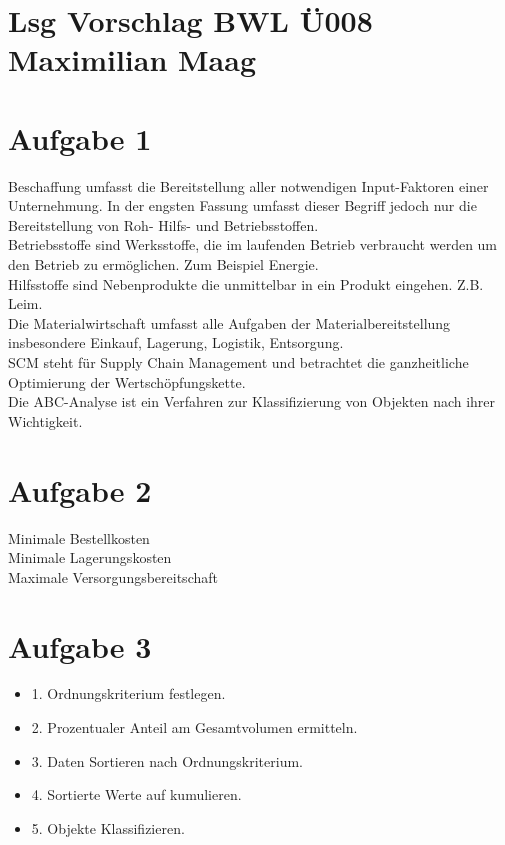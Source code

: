 \documentclass{article}
\begin{document}
	\section*{Lsg Vorschlag BWL Ü008 Maximilian Maag}
	\section*{Aufgabe 1}
	Beschaffung umfasst die Bereitstellung aller notwendigen Input-Faktoren einer Unternehmung. In der engsten Fassung umfasst dieser Begriff jedoch nur die Bereitstellung von Roh- Hilfs- und Betriebsstoffen. \\
	Betriebsstoffe sind Werksstoffe, die im laufenden Betrieb verbraucht werden um den Betrieb zu ermöglichen. Zum Beispiel Energie. \\
	Hilfsstoffe sind Nebenprodukte die unmittelbar in ein Produkt eingehen. Z.B. Leim. \\
	Die Materialwirtschaft umfasst alle Aufgaben der Materialbereitstellung insbesondere Einkauf, Lagerung, Logistik, Entsorgung. \\
	SCM steht für Supply Chain Management und betrachtet die ganzheitliche Optimierung der Wertschöpfungskette. \\
	Die ABC-Analyse ist ein Verfahren zur Klassifizierung von Objekten nach ihrer Wichtigkeit.
	\section*{Aufgabe 2}
	Minimale Bestellkosten \\
	Minimale Lagerungskosten \\
	Maximale Versorgungsbereitschaft
	\section*{Aufgabe 3}
	\begin{itemize}
		\item 1. Ordnungskriterium festlegen. 
		\item 2. Prozentualer Anteil am Gesamtvolumen ermitteln.
		\item 3. Daten Sortieren nach Ordnungskriterium. 
		\item 4. Sortierte Werte auf kumulieren.
		\item 5. Objekte Klassifizieren. 
	\end{itemize}
\end{document}
